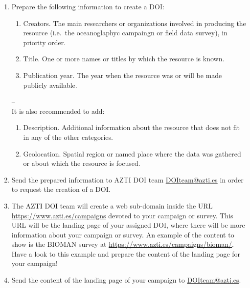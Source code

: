 \documentclass[
]{book}
\providecommand{\tightlist}{%
  \setlength{\itemsep}{0pt}\setlength{\parskip}{0pt}}
\begin{document}
\begin{enumerate}
\def\labelenumi{\arabic{enumi}.}
\item
  Prepare the following information to create a DOI:

  \begin{enumerate}
  \def\labelenumii{\alph{enumii}.}
  \tightlist
  \item
    Creators. The main researchers or organizations involved in producing the resource (i.e.~the oceanoglaphyc campaingn or field data survey), in priority order.
  \item
    Title. One or more names or titles by which the resource is known.
  \item
    Publication year. The year when the resource was or will be made publicly available.
  \end{enumerate}

  --\\
  It is also recommended to add:

  \begin{enumerate}
  \def\labelenumii{\alph{enumii}.}
  \setcounter{enumii}{3}
  \tightlist
  \item
    Description. Additional information about the resource that does not fit in any of the other categories.
  \item
    Geolocation. Spatial region or named place where the data was gathered or about which the resource is focused.
  \end{enumerate}
\item
  Send the prepared information to AZTI DOI team \url{DOIteam@azti.es} in order to request the creation of a DOI.
\item
  The AZTI DOI team will create a web sub-domain inside the URL \href{https://www.azti.es/campaigns/}{https://www.azti.es/campaigns} devoted to your campaign or survey. This URL will be the landing page of your assigned DOI, where there will be more information about your campaign or survey. An example of the content to show is the BIOMAN survey at \url{https://www.azti.es/campaigns/bioman/}. Have a look to this example and prepare the content of the landing page for your campaign!
\item
  Send the content of the landing page of your campaign to \url{DOIteam@azti.es}.


\end{enumerate}
\end{document}
